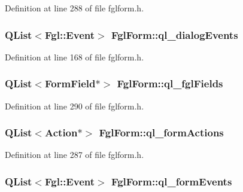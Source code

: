 Definition at line 288 of file fglform.h.

\hypertarget{classFglForm_a764e11f62e1849d568cda143fa11583e}{
\subsubsection[{ql\_\-dialogEvents}]{\setlength{\rightskip}{0pt plus 5cm}QList$<${\bf Fgl::Event}$>$ {\bf FglForm::ql\_\-dialogEvents}}}
\label{classFglForm_a764e11f62e1849d568cda143fa11583e}


Definition at line 168 of file fglform.h.

\hypertarget{classFglForm_a1d775e481b65ae50b2a557fa9ae975c5}{
\subsubsection[{ql\_\-fglFields}]{\setlength{\rightskip}{0pt plus 5cm}QList$<${\bf FormField}$\ast$$>$ {\bf FglForm::ql\_\-fglFields}}}
\label{classFglForm_a1d775e481b65ae50b2a557fa9ae975c5}


Definition at line 290 of file fglform.h.

\hypertarget{classFglForm_a091b50c03ba4a353485d34ea34f4001a}{
\subsubsection[{ql\_\-formActions}]{\setlength{\rightskip}{0pt plus 5cm}QList$<${\bf Action}$\ast$$>$ {\bf FglForm::ql\_\-formActions}}}
\label{classFglForm_a091b50c03ba4a353485d34ea34f4001a}


Definition at line 287 of file fglform.h.

\hypertarget{classFglForm_aec60babfa521575768a4aa1147318ba1}{
\subsubsection[{ql\_\-formEvents}]{\setlength{\rightskip}{0pt plus 5cm}QList$<${\bf Fgl::Event}$>$ {\bf FglForm::ql\_\-formEvents}}}
\label{classFglForm_aec60babfa521575768a4aa1147318ba1}


